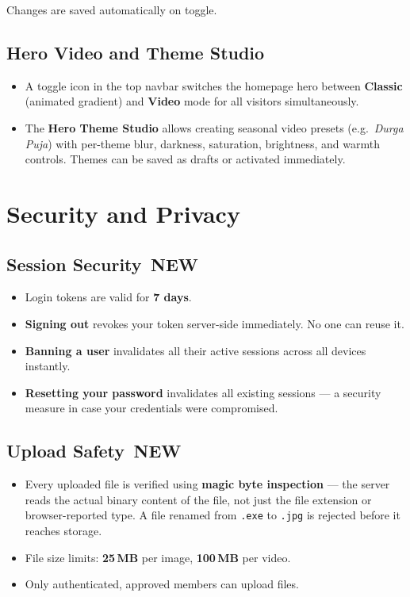 \documentclass[12pt,a4paper]{article}
\newcommand{\newbadge}{%
  \colorbox{NewFrame}{\color{white}\,\textbf{\footnotesize NEW}\,}%
}
\begin{document}
Changes are saved automatically on toggle.

\subsection{Hero Video and Theme Studio}

\begin{itemize}
  \item A toggle icon in the top navbar switches the homepage hero between \textbf{Classic} (animated gradient) and \textbf{Video} mode for all visitors simultaneously.
  \item The \textbf{Hero Theme Studio} allows creating seasonal video presets (e.g.\ \textit{Durga Puja}) with per-theme blur, darkness, saturation, brightness, and warmth controls. Themes can be saved as drafts or activated immediately.
\end{itemize}

\section{Security and Privacy}
\label{sec:security}

\subsection{Session Security \newbadge}

\begin{itemize}
  \item Login tokens are valid for \textbf{7 days}.
  \item \textbf{Signing out} revokes your token server-side immediately. No one can reuse it.
  \item \textbf{Banning a user} invalidates all their active sessions across all devices instantly.
  \item \textbf{Resetting your password} invalidates all existing sessions --- a security measure in case your credentials were compromised.
\end{itemize}

\subsection{Upload Safety \newbadge}

\begin{itemize}
  \item Every uploaded file is verified using \textbf{magic byte inspection} --- the server reads the actual binary content of the file, not just the file extension or browser-reported type. A file renamed from \texttt{.exe} to \texttt{.jpg} is rejected before it reaches storage.
  \item File size limits: \textbf{25\,MB} per image, \textbf{100\,MB} per video.
  \item Only authenticated, approved members can upload files.
\end{itemize}
\end{document}
